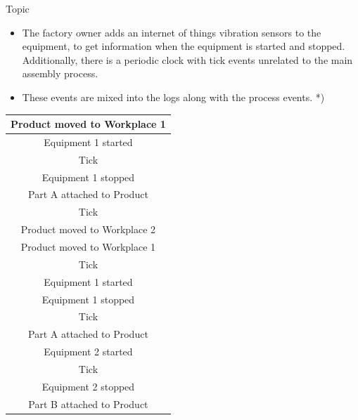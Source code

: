 \documentclass[final,xcolor={usenames,x11names}]{beamer}
\newlength{\halfcolwid}
\begin{document}
\begin{frame}[t]
\begin{columns}[t]
\begin{column}{\halfcolwid}
\begin{alertblock}{Topic}
\begin{itemize}
\item The factory owner adds an internet of things \colorbox{PaleTurquoise1>wheel,2,5}{vibration sensors} to the equipment, to get information when the equipment is started and stopped.
Additionally, there is a periodic clock with \colorbox{PaleTurquoise1>wheel,4,5}{tick} events unrelated to the main assembly process.
\item These events are mixed into the logs along with the process events. *)
\end{itemize}

\begin{center}
{
\ttfamily
\begin{tabular}{|c|}
  \hline
  \cellcolor{PaleTurquoise1}
Product moved to Workplace 1
  \\
  \hline
  \cellcolor{PaleTurquoise1>wheel,2,5}
Equipment 1 started
  \\
  \hline
  \cellcolor{PaleTurquoise1>wheel,4,5}
Tick
  \\
  \hline
  \cellcolor{PaleTurquoise1>wheel,2,5}
Equipment 1 stopped
  \\
  \hline
  \cellcolor{PaleTurquoise1}
Part A attached to Product
  \\
  \hline
  \cellcolor{PaleTurquoise1>wheel,4,5}
Tick
  \\
  \hline
  \cellcolor{PaleTurquoise1}
Product moved to Workplace 2
  \\
  \hline
  \cellcolor{PaleTurquoise1>wheel,1,5}
Product moved to Workplace 1
  \\
  \hline
  \cellcolor{PaleTurquoise1>wheel,4,5}
Tick
  \\
  \hline
  \cellcolor{PaleTurquoise1>wheel,2,5}
Equipment 1 started
  \\
  \hline
  \cellcolor{PaleTurquoise1>wheel,2,5}
Equipment 1 stopped
  \\
  \hline
  \cellcolor{PaleTurquoise1>wheel,4,5}
Tick
  \\
  \hline
  \cellcolor{PaleTurquoise1>wheel,1,5}
Part A attached to Product
  \\
  \hline
  \cellcolor{PaleTurquoise1>wheel,2,5}
Equipment 2 started
  \\
  \hline
  \cellcolor{PaleTurquoise1>wheel,4,5}
Tick
  \\
  \hline
  \cellcolor{PaleTurquoise1>wheel,2,5}
Equipment 2 stopped
  \\
  \hline
  \cellcolor{PaleTurquoise1}
Part B attached to Product
  \\

\end{tabular}}
\end{center}
\end{alertblock}
\end{column}
\end{columns}
\end{frame}
\end{document}
